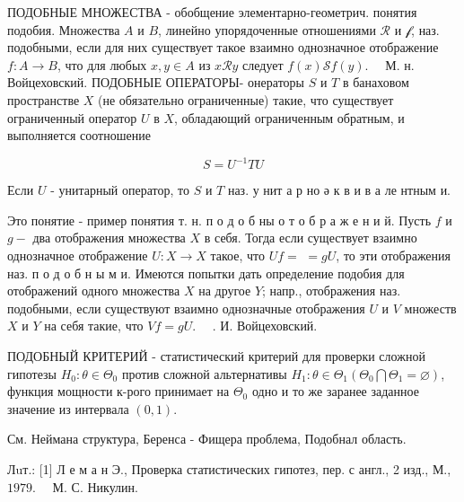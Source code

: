 \documentclass[10pt]{article}
\begin{document}
ПОДОБНЫЕ МНОЖЕСТВА - обобщение элементарно-геометрич. понятия подобия. Множества $A$ и $B$, линейно упорядоченные отношениями $\mathscr{R}$ и $\mathscr{f}$, наз. подобными, если для них существует такое взаимно однозначное отображение $f: A \rightarrow B$, что для любых $x, y \in A$ из $x \mathscr{R} y$ следует $f(x) \mathscr{S} f(y) . \quad$ М. н. Войцеховский. ПОДОБНЫЕ ОПЕРАТОРЫ- онераторы $S$ и $T$ в банаховом пространстве $X$ (не обязательно ограниченные) такие, что существует ограниченный оператор $U$ в $X$, обладающий ограниченным обратным, и выполняется соотношение



\[

S=U^{-1} T U

\]



Если $U$ - унитарный оператор, то $S$ и $T$ наз. у нит а р но ә к в и в а ле нтным и.



Это понятие - пример понятия т. н. п о д о б ны о т о б р а ж е н и й. Пусть $f$ и $g-$ два отображения множества $X$ в себя. Тогда если существует взаимно однозначное отображение $U: X \rightarrow X$ такое, что $U f=$ $=g U$, то эти отображения наз. п о д о б н ы м и. Имеются попытки дать определение подобия для отображений одного множества $X$ на другое $Y$; напр., отображения наз. подобными, если существуют взаимно однозначные отображения $U$ и $V$ множеств $X$ и $Y$ на себя такие, что $V f=g U$. $\quad$. И. Войцеховский.



ПОДОБНЫЙ КРИТЕРИЙ - статистический критерий для проверки сложной гипотезы $H_{0}: \theta \in \Theta_{0}$ против сложной альтернативы $H_{1}: \theta \in \Theta_{1}\left(\Theta_{0} \bigcap \Theta_{1}=\varnothing\right)$, функция мощности к-рого принимает на $\Theta_{0}$ одно и то же заранее заданное значение из интервала $(0,1)$.



См. Неймана структура, Беренса - Фищера проблема, Подобнал область.



Лuт.: [1] Л е м а н Э., Проверка статистических гипотез, пер. с англ., 2 изд., М., $1979 . \quad$ М. С. Никулин.
\end{document}
